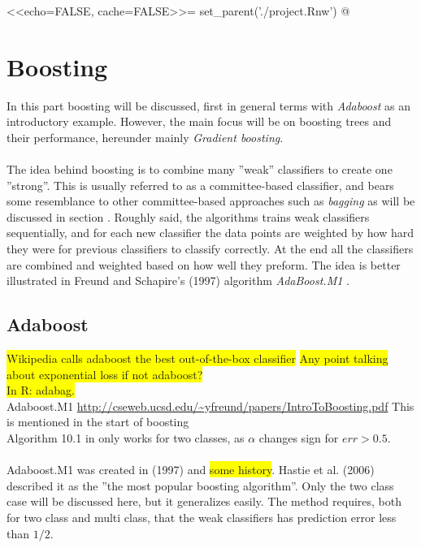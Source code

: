 <<echo=FALSE, cache=FALSE>>=
set_parent('./project.Rnw')
@
\section{Boosting}
\label{sec:Boosting}
In this part boosting will be discussed, first in general terms with \textit{Adaboost} as an introductory example. However, the main focus will be on boosting trees and their performance, hereunder mainly \textit{Gradient boosting}. \\
\\
The idea behind boosting is to combine many ''weak'' classifiers to create one ''strong''. This is usually referred to as a committee-based classifier, and bears some resemblance to other committee-based approaches such as \textit{bagging} as will be discussed in section . Roughly said, the algorithms trains weak classifiers sequentially, and for each new classifier the data points are weighted by how hard they were for previous classifiers to classify correctly. At the end all the classifiers are combined and weighted based on how well they preform. The idea is better illustrated in Freund and Schapire's (1997) algorithm \textit{AdaBoost.M1} \cite{adaboostM1}.
\subsection{Adaboost}
\label{sub:Adaboost}
\colorbox{yellow}{Wikipedia calls adaboost the best out-of-the-box classifier}
\colorbox{yellow}{Any point talking about exponential loss if not adaboost?}\\
\colorbox{yellow}{In R: adabag.}\\
Adaboost.M1 \url{http://cseweb.ucsd.edu/~yfreund/papers/IntroToBoosting.pdf} This is mentioned in the start of boosting \cite{modstat} \\
Algorithm 10.1 in \cite{modstat} only works for two classes, as $\alpha$ changes sign for $err > 0.5$. \\
\\
Adaboost.M1 was created in (1997) and \colorbox{yellow}{some history}. Hastie et al. (2006) \cite{modstat} described it as the ''the most popular boosting algorithm''. Only the two class case will be discussed here, but it generalizes easily. The method requires, both for two class and multi class, that the weak classifiers has prediction error less than $1/2$.

